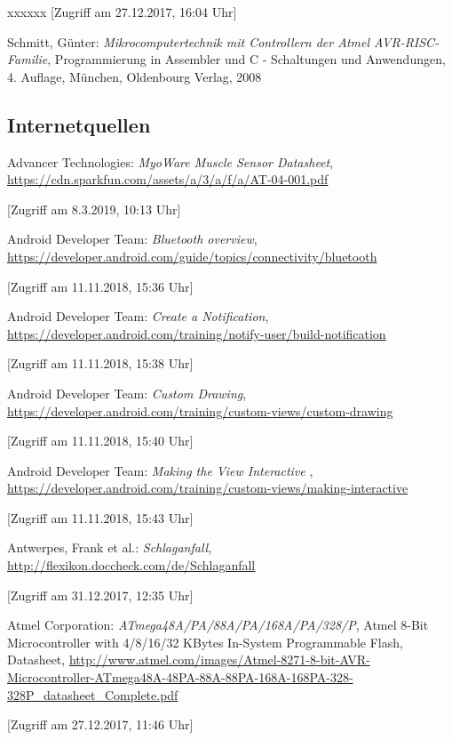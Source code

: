 \begin{thebibliography}{xxxxxx}
[Zugriff am 27.12.2017, 16:04 Uhr]

 Schmitt, Günter: \textit{Mikrocomputertechnik mit Controllern der Atmel AVR-RISC-Familie}, Programmierung in Assembler und C - Schaltungen und Anwendungen, 4. Auflage, München, Oldenbourg Verlag, 2008

\subsection*{Internetquellen}

 Advancer Technologies: \textit{MyoWare Muscle Sensor Datasheet}, \url{https://cdn.sparkfun.com/assets/a/3/a/f/a/AT-04-001.pdf}

[Zugriff am 8.3.2019, 10:13 Uhr]

 Android Developer Team: \textit{Bluetooth overview}, \url{https://developer.android.com/guide/topics/connectivity/bluetooth}

[Zugriff am 11.11.2018, 15:36 Uhr]

 Android Developer Team: \textit{Create a Notification}, \url{https://developer.android.com/training/notify-user/build-notification}

[Zugriff am 11.11.2018, 15:38 Uhr]

 Android Developer Team: \textit{Custom Drawing}, \url{https://developer.android.com/training/custom-views/custom-drawing}

[Zugriff am 11.11.2018, 15:40 Uhr]

 Android Developer Team: \textit{Making the View Interactive
}, \url{https://developer.android.com/training/custom-views/making-interactive}

[Zugriff am 11.11.2018, 15:43 Uhr]

 Antwerpes, Frank et al.: \textit{Schlaganfall}, \url{http://flexikon.doccheck.com/de/Schlaganfall}

[Zugriff am 31.12.2017, 12:35 Uhr]

 Atmel Corporation: \textit{ATmega48A/PA/88A/PA/168A/PA/328/P}, Atmel 8-Bit Microcontroller with 4/8/16/32 KBytes In-System Programmable Flash, Datasheet, \url{http://www.atmel.com/images/Atmel-8271-8-bit-AVR-Microcontroller-ATmega48A-48PA-88A-88PA-168A-168PA-328-328P_datasheet_Complete.pdf} 

[Zugriff am 27.12.2017, 11:46 Uhr]


\end{thebibliography}
